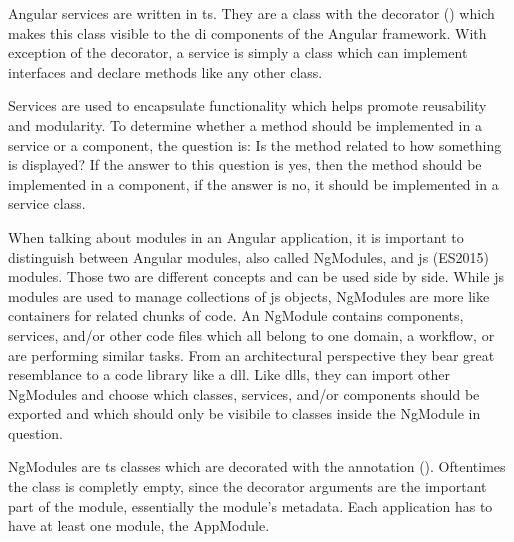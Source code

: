 
Angular services are written in \gls{ts}. They are a class with the  decorator () which makes this class visible to the \gls{di} components of the Angular framework. With exception of the decorator, a service is simply a class which can implement interfaces and declare methods like any other class.

Services are used to encapsulate functionality which helps promote reusability and modularity. To determine whether a method should be implemented in a service or a component, the question is: Is the method related to how something is displayed? If the answer to this question is yes, then the method should be implemented in a component, if the answer is no, it should be implemented in a service class.



When talking about modules in an Angular application, it is important to distinguish between Angular modules, also called NgModules, and \gls{js} (ES2015) modules. Those two are different concepts and can be used side by side. While \gls{js} modules are used to manage collections of \gls{js} objects, NgModules are more like containers for related chunks of code. An NgModule contains components, services, and/or other code files which all belong to one domain, a workflow, or are performing similar tasks. From an architectural perspective they bear great resemblance to a code library like a \gls{dll}. Like \gls{dll}s, they can import other NgModules and choose which classes, services, and/or components should be exported and which should only be visibile to classes inside the NgModule in question.


NgModules are \gls{ts} classes which are decorated with the  annotation (). Oftentimes the class is completly empty, since the decorator arguments are the important part of the module, essentially the module's metadata. Each application has to have at least one module, the AppModule.

